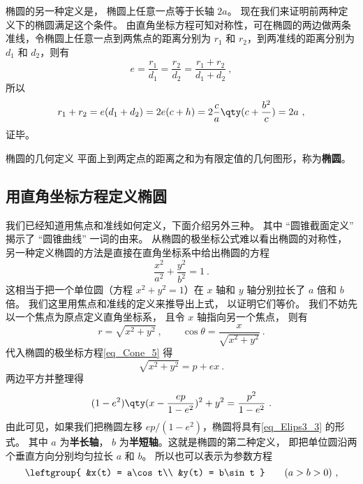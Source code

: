 

椭圆的另一种定义是， 椭圆上任意一点等于长轴 $2a$。 现在我们来证明前两种定义下的椭圆满足这个条件。 由直角坐标方程可知对称性，可在椭圆的两边做两条准线，令椭圆上任意一点到两焦点的距离分别为 $r_1$ 和 $r_2$，到两准线的距离分别为 $d_1$ 和 $d_2$，则有
\begin{equation}
e = \frac{r_1}{d_1} = \frac{r_2}{d_2} = \frac{r_1 + r_2}{d_1 + d_2}~,
\end{equation}
所以
\begin{equation}\label{eq_Elips3_9}
r_1 + r_2 = e(d_1+d_2) = 2e(c + h) = 2\frac{c}{a} \qty( c + \frac{b^2}{c} ) = 2a~,
\end{equation}
证毕。




\begin{definition}{椭圆的几何定义}
平面上到两定点的距离之和为有限定值的几何图形，称为\textbf{椭圆}。
\end{definition}


\subsection{用直角坐标方程定义椭圆}

我们已经知道用焦点和准线如何定义，下面介绍另外三种。 其中 “圆锥截面定义” 揭示了 “圆锥曲线” 一词的由来。
从椭圆的极坐标公式难以看出椭圆的对称性， 另一种定义椭圆的方法是直接在直角坐标系中给出椭圆的方程
\begin{equation}\label{eq_Elips3_3}
\frac{x^2}{a^2} + \frac{y^2}{b^2} = 1~.
\end{equation}
这相当于把一个单位圆（方程 $x^2 + y^2 = 1$）在 $x$ 轴和 $y$ 轴分别拉长了 $a$ 倍和 $b$ 倍。 我们这里用焦点和准线的定义来推导出上式， 以证明它们等价。 我们不妨先以一个焦点为原点定义直角坐标系， 且令 $x$ 轴指向另一个焦点， 则有
\begin{equation}
r = \sqrt{x^2 + y^2}~, \qquad \cos\theta = \frac{x}{\sqrt{x^2 + y^2}}~.
\end{equation}
代入椭圆的极坐标方程\autoref{eq_Cone_5}  得
\begin{equation}
\sqrt{x^2 + y^2} = p + ex~.
\end{equation}
两边平方并整理得
\begin{equation}\label{eq_Elips3_2}
(1 - e^2) \qty( x - \frac{ep}{1 - e^2} )^2 + y^2 = \frac{p^2}{1 - e^2}~.
\end{equation}
由此可见，如果我们把椭圆左移 $ep/(1 - e^2)$，椭圆将具有\autoref{eq_Elips3_3} 的形式。 其中 $a$ 为\textbf{半长轴}， $b$ 为\textbf{半短轴}。这就是椭圆的第二种定义， 即把单位圆沿两个垂直方向分别均匀拉长 $a$ 和 $b$。 所以也可以表示为参数方程
\begin{equation}\label{eq_Elips3_1}
\leftgroup{
&x(t) = a\cos t\\
&y(t) = b\sin t
} \qquad
(a > b > 0)~,
\end{equation}

